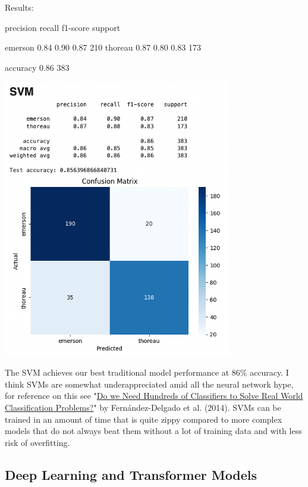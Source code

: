 \documentclass[
]{article}
\newenvironment{Shaded}{}{}
\newcommand{\NormalTok}[1]{#1}
\begin{document}
Results:

\begin{Shaded}
\begin{Highlighting}[]
\NormalTok{precision    recall  f1{-}score   support}

\NormalTok{emerson       0.84      0.90      0.87       210}
\NormalTok{thoreau       0.87      0.80      0.83       173}

\NormalTok{accuracy                          0.86       383}
\end{Highlighting}
\end{Shaded}

\includegraphics[width=0.75\textwidth]{svm_confusion.png}


The SVM achieves our best traditional model performance at 86\%
accuracy. I think SVM\textquotesingle s are somewhat underappreciated
amid all the neural network hype, for reference on this see
"\href{https://dl.acm.org/doi/10.5555/2627435.2697065}{Do we Need
Hundreds of Classifiers to Solve Real World Classification Problems?}"
by Fernández-Delgado et al. (2014). SVMs can be trained in an amount of
time that is quite zippy compared to more complex models that do not
always beat them without a lot of training data and with less risk of
overfitting.

\subsection{Deep Learning and Transformer
Models}\label{deep-learning-and-transformer-models}
\end{document}
